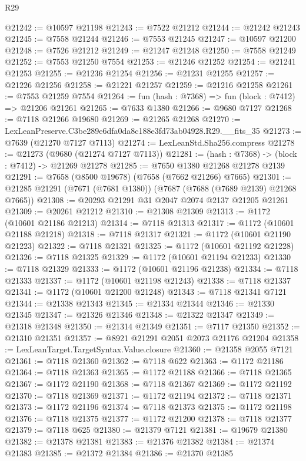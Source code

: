 \begin{lexlean}{R29}
\begin{coremodule}
@21242 := @10597 @21198
@21243 := @7522 @21212
@21244 := @21242 @21243
@21245 := @7558 @21244
@21246 := @7553 @21245
@21247 := @10597 @21200
@21248 := @7526 @21212
@21249 := @21247 @21248
@21250 := @7558 @21249
@21252 := @7553 @21250 @7554
@21253 := @21246 @21252
@21254 := @21241 @21253
@21255 := @21236 @21254
@21256 := @21231 @21255
@21257 := @21226 @21256
@21258 := @21221 @21257
@21259 := @21216 @21258
@21261 := @7553 @21259 @7554
@21264 := fun (hash : @7368) => fun (block : @7412) => @21206 @21261
@21265 := @7633 @1380
@21266 := @9680 @7127
@21268 := @7118 @21266 @19680
@21269 := @21265 @21268
@21270 := LexLeanPreserve.C3be289e6dfa0da8c188e3fd73ab04928.R29.__fits_35
@21273 := @7639 (@21270 @7127 @7113)
@21274 := LexLeanStd.Sha256.compress
@21278 := @21273 (@9680 (@21274 @7127 @7113))
@21281 := (hash : @7368) -> (block : @7412) -> @21269 @21278
@21285 := @7650 @1380 @21268 @21278 @2139
@21291 := @7658 (@8500 @19678) (@7658 (@7662 @21266) @7665)
@21301 := @21285 @21291 (@7671 (@7681 @1380)) (@7687 (@7688 (@7689 @2139) @21268 @7665))
@21308 := @20293 @21291 @31 @2047 @2074 @2137 @21205 @21261
@21309 := @20261 @21212
@21310 := @21308 @21309
@21313 := @1172 (@10601 @21186 @21213)
@21314 := @7118 @21313
@21317 := @1172 (@10601 @21188 @21218)
@21318 := @7118 @21317
@21321 := @1172 (@10601 @21190 @21223)
@21322 := @7118 @21321
@21325 := @1172 (@10601 @21192 @21228)
@21326 := @7118 @21325
@21329 := @1172 (@10601 @21194 @21233)
@21330 := @7118 @21329
@21333 := @1172 (@10601 @21196 @21238)
@21334 := @7118 @21333
@21337 := @1172 (@10601 @21198 @21243)
@21338 := @7118 @21337
@21341 := @1172 (@10601 @21200 @21248)
@21343 := @7118 @21341 @7121
@21344 := @21338 @21343
@21345 := @21334 @21344
@21346 := @21330 @21345
@21347 := @21326 @21346
@21348 := @21322 @21347
@21349 := @21318 @21348
@21350 := @21314 @21349
@21351 := @7117 @21350
@21352 := @21310 @21351
@21357 := @8921 @21291 @2051 @2073 @21176 @21204
@21358 := LexLeanTarget.TargetSyntax.Value.closure
@21360 := @21358 @2055 @7121
@21361 := @7118 @21360
@21362 := @7118 @622
@21363 := @1172 @21186
@21364 := @7118 @21363
@21365 := @1172 @21188
@21366 := @7118 @21365
@21367 := @1172 @21190
@21368 := @7118 @21367
@21369 := @1172 @21192
@21370 := @7118 @21369
@21371 := @1172 @21194
@21372 := @7118 @21371
@21373 := @1172 @21196
@21374 := @7118 @21373
@21375 := @1172 @21198
@21376 := @7118 @21375
@21377 := @1172 @21200
@21378 := @7118 @21377
@21379 := @7118 @625
@21380 := @21379 @7121
@21381 := @19679 @21380
@21382 := @21378 @21381
@21383 := @21376 @21382
@21384 := @21374 @21383
@21385 := @21372 @21384
@21386 := @21370 @21385

\end{coremodule}
\end{lexlean}
